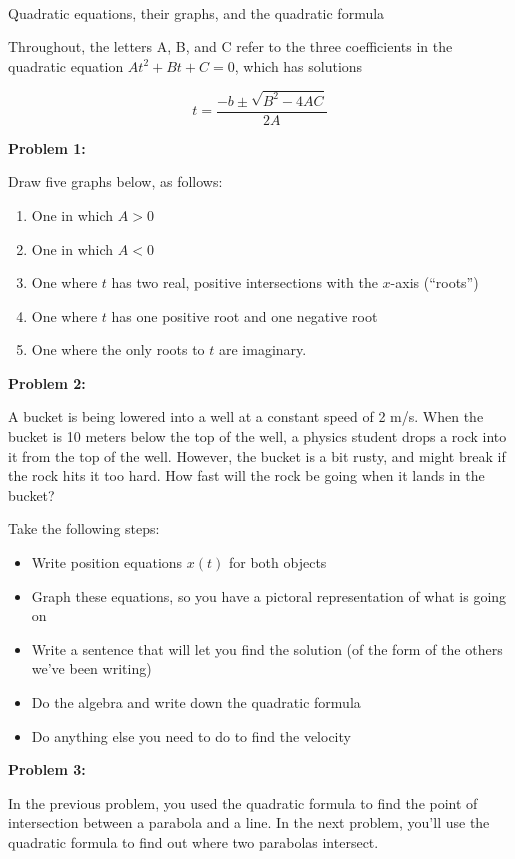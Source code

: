 \documentclass[12pt]{article}
\newcommand{\BC}{\begin{center}}
\newcommand{\EC}{\end{center}}
\newcommand{\BI}{\begin{itemize}}
\newcommand{\EI}{\end{itemize}}
\begin{document}
\large
\BC
{}
\sc
\\Quadratic equations, their graphs, and the quadratic formula
\EC
\normalsize

Throughout, the letters A, B, and C refer to the three
coefficients in the quadratic equation $At^2 + Bt + C = 0$, which has solutions

$$
t = \frac {-b \pm \sqrt{B^2 - 4AC}}{2A}
$$

{\large \bf Problem 1:}

Draw five graphs below, as follows:

\begin{enumerate}
\item One in which $A>0$
\item One in which $A<0$
\item One where $t$ has two real, positive intersections with the $x$-axis (``roots'')
\item One where $t$ has one positive root and one negative root
\item One where the only roots to $t$ are imaginary.
\end{enumerate}

\newpage

{\large \bf Problem 2:}

A bucket is being lowered into a well at a constant speed of 2 m/s. When the 
bucket is 10 meters below the top of the well, a physics student drops a rock
into it from the top of the well. However, the bucket is a bit rusty, and might
break if the rock hits it too hard. How fast will the rock be going when it lands
in the bucket?

Take the following steps:
\BI
\item Write position equations $x(t)$ for both objects
\item Graph these equations, so you have a pictoral representation of what is going on
\item Write a sentence that will let you find the solution (of the form of the 
others we've been writing) 
\item Do the algebra and write down the quadratic formula
\item Do anything else you need to do to find the velocity
\EI


\newpage

{\large \bf Problem 3:}

In the previous problem, you used the quadratic formula to find the point of 
intersection between a parabola and a line. In the next problem,
you'll use the quadratic formula to find out where two parabolas intersect.
\end{document}
